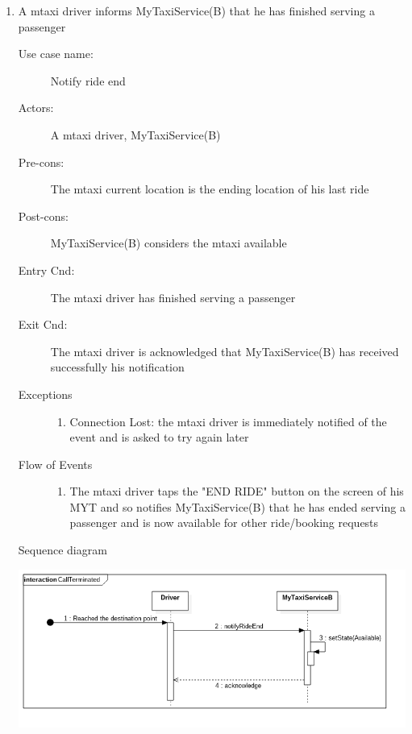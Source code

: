 \documentclass[11pt,titlepage]{article} %
\begin{document}
\begin{enumerate}
	       \item A mtaxi driver informs MyTaxiService(B) that he has finished serving a passenger
		\begin{description}
		        \item [Use case name:] Notify ride end
		        \item [Actors:] A mtaxi driver, MyTaxiService(B)
		        \item [Pre-cons:] The mtaxi current location is the ending location of his last ride
		        \item [Post-cons:] MyTaxiService(B) considers the mtaxi available
		        \item [Entry Cnd:] The mtaxi driver has finished serving a passenger
		        \item [Exit Cnd:] The mtaxi driver is acknowledged that MyTaxiService(B) has received successfully his
		        notification
		        \item [Exceptions]\hfill
			\begin{enumerate}
			          \item Connection Lost: the mtaxi driver is immediately notified of the event and is asked to try again
			          later
			\end{enumerate}
		        \item [Flow of Events]\hfill
			\begin{enumerate}
			          \item The mtaxi driver taps the "END RIDE" button on the screen of his MYT and so notifies MyTaxiService(B) that
			          he has ended serving a passenger and is now available for other ride/booking requests
			\end{enumerate}
		\end{description}
		Sequence diagram
		\begin{center}
		\includegraphics[scale=0.52]{usecase4.png}
		\end{center}



\end{enumerate}
\end{document}
